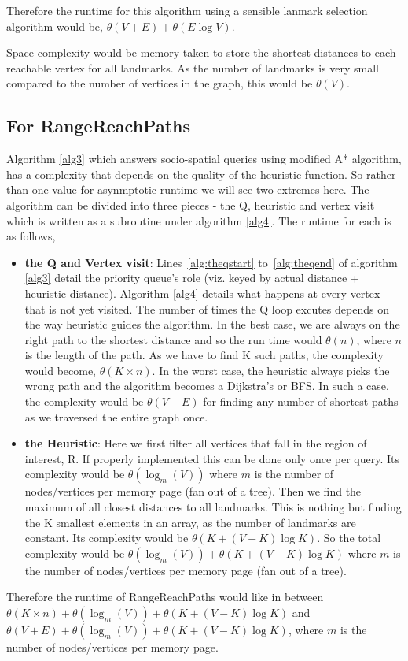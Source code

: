 Therefore the runtime for this algorithm using a sensible lanmark selection algorithm would be, $\theta(V + E) + \theta(E\log V)$.

Space complexity would be memory taken to store the shortest distances to each reachable vertex for all landmarks. As the number of landmarks is very small compared to the number of vertices in the graph, this would be $\theta(V)$.

\subsection{For RangeReachPaths}
Algorithm \ref{alg3} which answers socio-spatial queries using modified A* algorithm, has a complexity that depends on the quality of the heuristic function. So rather than one value for asynmptotic runtime we will see two extremes here. The algorithm can be divided into three pieces - the Q, heuristic and vertex visit which is written as a subroutine under algorithm \ref{alg4}. The runtime for each is as follows,

\begin{itemize}
	\item \textbf{the Q and Vertex visit}: Lines~\ref{alg:theqstart} to~\ref{alg:theqend} of algorithm \ref{alg3} detail the priority queue's role (viz. keyed by actual distance + heuristic distance). Algorithm \ref{alg4} details what happens at every vertex that is not yet visited. The number of times the Q loop excutes depends on the way heuristic guides the algorithm. In the best case, we are always on the right path to the shortest distance and so the run time would $\theta(n)$, where $n$ is the length of the path. As we have to find K such paths, the complexity would become, $\theta(K \times n)$. In the worst case, the heuristic always picks the wrong path and the algorithm becomes a Dijkstra's or BFS. In such a case, the complexity would be $\theta(V + E)$ for finding any number of shortest paths as we traversed the entire graph once. 

	\item \textbf{the Heuristic}: Here we first filter all vertices that fall in the region of interest, R. If properly implemented this can be done only once per query. Its complexity would be $\theta(\log_m (V))$ where $m$ is the number of nodes/vertices per memory page (fan out of a tree). Then we find the maximum of all closest distances to all landmarks. This is nothing but finding the K smallest elements in an array, as the number of landmarks are constant. Its complexity would be $\theta(K + (V-K)\log K)$. So the total complexity would be $\theta(\log_m (V)) + \theta(K + (V-K)\log K)$ where $m$ is the number of nodes/vertices per memory page (fan out of a tree).
\end{itemize}

Therefore the runtime of RangeReachPaths would like in between $\theta(K \times n) + \theta(\log_m (V)) + \theta(K + (V-K)\log K)$ and $\theta(V + E) + \theta(\log_m (V)) + \theta(K + (V-K)\log K)$, where $m$ is the number of nodes/vertices per memory page.